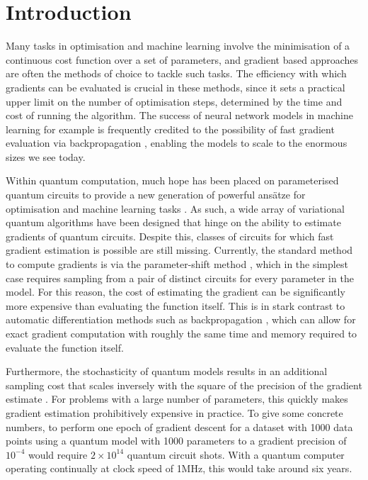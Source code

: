 \documentclass[a4paper,twocolumn,11pt,accepted=2025-09-06]{quantumarticle}
\begin{document}
\section{Introduction}
Many tasks in optimisation and machine learning involve the minimisation of a continuous cost function over a set of parameters, and gradient based approaches are often the methods of choice to tackle such tasks. The efficiency with which gradients can be evaluated is crucial in these methods, since it sets a practical upper limit on the number of optimisation steps, determined by the time and cost of running the algorithm. The success of neural network models in machine learning for example is frequently credited to the possibility of fast gradient evaluation via backpropagation \cite{backprophinton,autodiff}, enabling the models to scale to the enormous sizes we see today. 

Within quantum computation, much hope has been placed on parameterised quantum circuits to provide a new generation of powerful ans\"atze for optimisation and machine learning tasks \cite{cerezo2021variational,benedetti2019parameterized}. As such, a wide array of variational quantum algorithms have been designed that hinge on the ability to estimate gradients of quantum circuits. Despite this, classes of circuits for which fast gradient estimation is possible are still missing. Currently, the standard method to compute gradients is via the parameter-shift method \cite{PS1,PS2,PS3,PS4}, which in the simplest case requires sampling from a pair of distinct circuits for every parameter in the model. For this reason, the cost of estimating the gradient can be significantly more expensive than evaluating the function itself. This is in stark contrast to automatic differentiation methods such as backpropagation \cite{autodiff}, which can allow for exact gradient computation with roughly the same time and memory required to evaluate the function itself.

Furthermore, the stochasticity of quantum models results in an additional sampling cost that scales inversely with the square of the precision of the gradient estimate \cite{PS2}. For problems with a large number of parameters, this quickly makes gradient estimation prohibitively expensive in practice. To give some concrete numbers, to perform one epoch of gradient descent for a dataset with 1000 data points using a quantum model with 1000 parameters to a gradient precision of $10^{-4}$ would require $2\times 10^{14}$ quantum circuit shots. With a quantum computer operating continually at clock speed of 1MHz, this would take around six years.  
\end{document}
